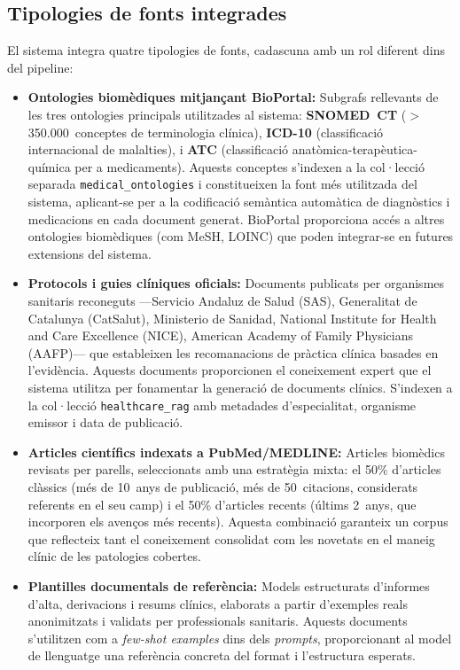 \documentclass[CAT]{TFUOC}%
\begin{document}
\subsection{Tipologies de fonts integrades}

El sistema integra quatre tipologies de fonts, cadascuna amb un rol diferent dins del pipeline:

\begin{itemize}
    \item \textbf{Ontologies biomèdiques mitjançant BioPortal:} Subgrafs rellevants de les tres ontologies principals utilitzades al sistema: \textbf{SNOMED~CT} ($>$350.000~conceptes de terminologia clínica), \textbf{ICD-10} (classificació internacional de malalties), i \textbf{ATC} (classificació anatòmica-terapèutica-química per a medicaments). Aquests conceptes s'indexen a la col·lecció separada \texttt{medical\_ontologies} i constitueixen la font més utilitzada del sistema, aplicant-se per a la codificació semàntica automàtica de diagnòstics i medicacions en cada document generat. BioPortal proporciona accés a altres ontologies biomèdiques (com MeSH, LOINC) que poden integrar-se en futures extensions del sistema.

    \item \textbf{Protocols i guies clíniques oficials:} Documents publicats per organismes sanitaris reconeguts ---Servicio Andaluz de Salud (SAS), Generalitat de Catalunya (CatSalut), Ministerio de Sanidad, National Institute for Health and Care Excellence (NICE), American Academy of Family Physicians (AAFP)--- que estableixen les recomanacions de pràctica clínica basades en l'evidència. Aquests documents proporcionen el coneixement expert que el sistema utilitza per fonamentar la generació de documents clínics. S'indexen a la col·lecció \texttt{healthcare\_rag} amb metadades d'especialitat, organisme emissor i data de publicació.

    \item \textbf{Articles científics indexats a PubMed/MEDLINE:} Articles biomèdics revisats per parells, seleccionats amb una estratègia mixta: el 50\% d'articles clàssics (més de 10~anys de publicació, més de 50~citacions, considerats referents en el seu camp) i el 50\% d'articles recents (últims 2~anys, que incorporen els avenços més recents). Aquesta combinació garanteix un corpus que reflecteix tant el coneixement consolidat com les novetats en el maneig clínic de les patologies cobertes.

    \item \textbf{Plantilles documentals de referència:} Models estructurats d'informes d'alta, derivacions i resums clínics, elaborats a partir d'exemples reals anonimitzats i validats per professionals sanitaris. Aquests documents s'utilitzen com a \textit{few-shot examples} dins dels \textit{prompts}, proporcionant al model de llenguatge una referència concreta del format i l'estructura esperats.
\end{itemize}
\end{document}
